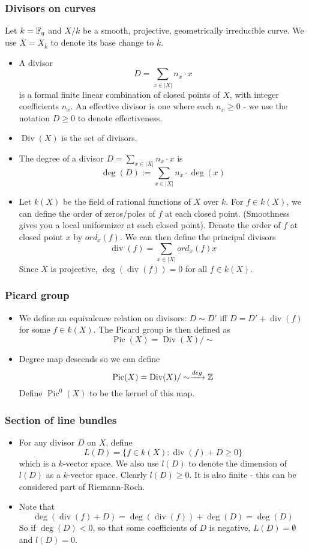\documentclass[letterpaper,11pt]{article}
\DeclareMathOperator{\Div}{Div}
\DeclareMathOperator{\divf}{div}
\DeclareMathOperator{\Pic}{Pic}
\begin{document}
\subsubsection{Divisors on curves}
Let $k = \mathbb{F}_q$ and $X/k$ be a smooth, projective, geometrically irreducible curve. We use $\overline{X} = X_{\overline{k}}$ to denote its base change to $\overline{k}$.
\begin{itemize}
    \item A divisor 
    \[
    D = \sum_{x \in |X|} n_x \cdot x
    \]
    is a formal finite linear combination of closed points of $X$, with integer coefficients $n_x$. An effective divisor is one where each $n_x \ge 0$ - we use the notation $D \ge 0$ to denote effectiveness.
    \item $\Div(X)$ is the set of divisors.
    \item The degree of a divisor $\displaystyle D = \sum_{x \in |X|} n_x \cdot x$ is
    \[
    \deg(D) := \sum_{x \in |X|} n_x \cdot \deg(x)
    \]
    \item Let $k(X)$ be the field of rational functions of $X$ over $k$. For $f \in k(X)$, we can define the order of zeros/poles of $f$ at each closed point. (Smoothness gives you a local uniformizer at each closed point). Denote the order of $f$ at closed point $x$ by $ord_x(f)$. We can then define the principal divisors 
    \[
    \divf(f) = \sum_{x \in |X|} ord_x (f) x
    \]
    Since $X$ is projective, $\deg (\divf(f)) = 0$ for all $f \in k(X)$.
\end{itemize}
\subsubsection{Picard group}
\begin{itemize}
    \item We define an equivalence relation on divisors: $D \sim D'$ iff $D = D' + \divf(f)$ for some $f \in k(X)$. The Picard group is then defined as
    \[
    \Pic(X) = \Div(X)/\sim
    \]
    \item Degree map descends so we can define
    \[
    \Pic(X) = \Div(X)/\sim \xrightarrow{deg} \ZZ
    \]
    Define $\Pic^0(X)$ to be the kernel of this map.
\end{itemize}
\subsubsection{Section of line bundles}
\begin{itemize}
    \item For any divisor $D$ on $X$, define
    \[
    L(D) = \{f \in k(X): \divf(f) + D \ge 0\}
    \]
    which is a $k$-vector space. We also use $l(D)$ to denote the dimension of $l(D)$ as a $k$-vector space. Clearly $l(D) \ge 0$. It is also finite - this can be considered part of Riemann-Roch.
    \item Note that
    \[
    \deg(\divf (f) + D) = \deg (\divf(f)) + \deg(D) = \deg (D)
    \]
    So if $\deg(D) < 0$, so that some coefficients of $D$ is negative, $L(D) = \emptyset$ and $l(D) = 0$.
\end{itemize}
\end{document}
